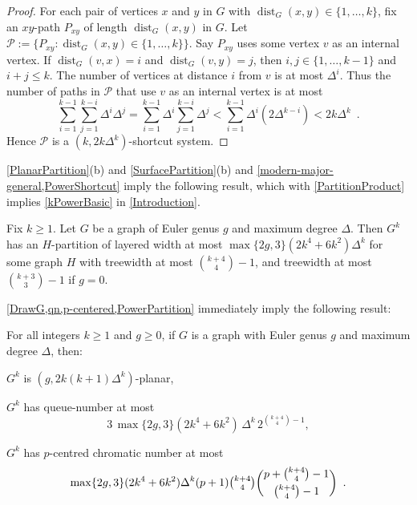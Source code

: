 \documentclass{patmorin}
\DeclareMathOperator{\dist}{dist}
\DeclareMathOperator{\qn}{qn}
\DeclarePairedDelimiter{\floor}{\lfloor}{\rfloor}
\newcommand{\PP}{\mathcal{P}}
\renewcommand{\le}{\leqslant}
\renewcommand{\geq}{\geqslant}
\renewcommand{\leq}{\leqslant}
\begin{document}
\begin{proof}
For each pair of vertices $x$ and $y$ in $G$ with $\dist_G(x,y)\in\{1,\dots,k\}$, fix an $xy$-path $P_{xy}$ of length 
$\dist_G(x,y)$  in $G$. Let $\PP:=\{P_{xy}: \dist_G(x,y)\in\{1,\dots,k\} \}$. Say $P_{xy}$ uses some vertex $v$ as an internal vertex. If $\dist_G(v,x)=i$ and $\dist_G(v,y)=j$, then $i,j\in\{1,\dots,k-1\}$ and $i+j\leq k$. The number of vertices at distance $i$ from $v$ is at most $\Delta^i$. Thus the number of paths in $\PP$ that use $v$ as an internal vertex is at most 
$$\sum_{i=1}^{k-1} \sum_{j=1}^{k-i} \Delta^i\Delta^j 
= \sum_{i=1}^{k-1} \Delta^i \sum_{j=1}^{k-i} \Delta^j 
< \sum_{i=1}^{k-1} \Delta^i ( 2 \Delta^{k-i} )
< 2k \Delta^k\enspace.$$
Hence $\PP$ is a $(k, 2k \Delta^k)$-shortcut system. 
\end{proof}

\cref{PlanarPartition}(b) and \cref{SurfacePartition}(b) and \cref{modern-major-general,PowerShortcut} imply the following result, which with \cref{PartitionProduct} implies \cref{kPowerBasic} in \cref{Introduction}.

\begin{thm}
\label{PowerPartition}
Fix $k\geq 1$. Let $G$ be a graph of Euler genus $g$ and maximum degree $\Delta$. 
Then $G^k$ has an $H$-partition of layered width at most $\max\{2g,3\} (2k^4+6k^2) \Delta^{k}$ 
for some graph $H$ with treewidth at most $\binom{k+4}{4}-1$, and treewidth 
at most $\binom{k+3}{3}-1$ if $g=0$. 
\end{thm}

\cref{DrawG,qn,p-centered,PowerPartition} immediately imply the following result:



\begin{cor}
For all integers $k\geq 1$ and $g\geq 0$, if $G$ is a graph with Euler genus $g$ and maximum degree $\Delta$, then:
\begin{compactitem}
\item $G^k$ is $(g, 2k(k+1)\Delta^{k} )$-planar, 
\item $G^k$ has queue-number at most 
$$3\,\max\{2g,3\} (2k^4+6k^2) \,\Delta^{k}\, 2^{\binom{k+4}{4}-1},$$
\item $G^k$ has  $p$-centred chromatic number at most 
$$\max\{2g,3\}(2k^4+6k^2) \Delta^{k}  (p+1) \tbinom{k+4}{4} 
\binom{p+\binom{k+4}{4}-1}{\binom{k+4}{4}-1}\enspace.$$
\end{compactitem}
\end{cor}
\end{document}
